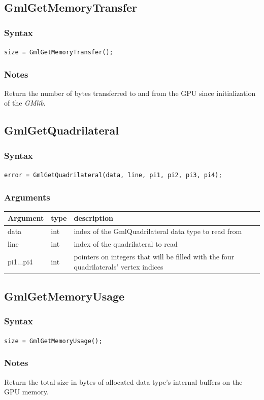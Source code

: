 \documentclass[a4paper,12pt]{article}
\begin{document}
\subsection{GmlGetMemoryTransfer}
\subsubsection*{Syntax}
{\tt size = GmlGetMemoryTransfer();}
\subsubsection*{Notes}
Return the number of bytes transferred to and from the GPU since initialization of the \emph{GMlib}.


\subsection{GmlGetQuadrilateral}
\subsubsection*{Syntax}
{\tt error = GmlGetQuadrilateral(data, line, pi1, pi2, pi3, pi4);}
\subsubsection*{Arguments}

\begin{tabular}{|m{2cm}|m{1.5cm}|m{10.5cm}|}
\hline
Argument   & type   & description \\
\hline
data       & int    & index of the GmlQuadrilateral data type to read from \\
\hline
line       & int    & index of the quadrilateral to read \\
\hline
pi1...pi4  & int    & pointers on integers that will be filled with the four quadrilaterals' vertex indices \\
\hline
\end{tabular}


\subsection{GmlGetMemoryUsage}
\subsubsection*{Syntax}
{\tt size = GmlGetMemoryUsage();}
\subsubsection*{Notes}
Return the total size in bytes of allocated data type's internal buffers on the GPU memory.
\end{document}
